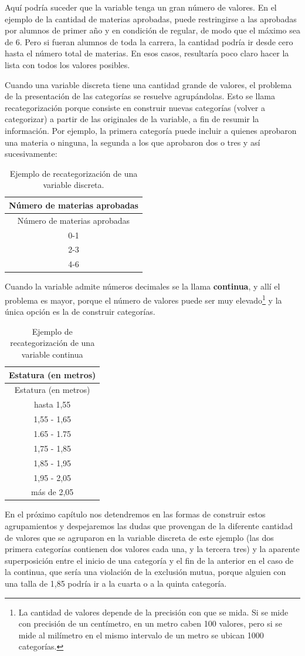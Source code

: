 \documentclass[]{book}
\let\rmarkdownfootnote\footnote%
\def\footnote{\protect\rmarkdownfootnote}
\begin{document}
Aquí podría suceder que la variable tenga un gran número de valores. En el ejemplo de la cantidad de materias aprobadas, puede restringirse a las aprobadas por alumnos de primer año y en condición de regular, de modo que el máximo sea de 6. Pero si fueran alumnos de toda la carrera, la cantidad podría ir desde cero hasta el número total de materias. En esos casos, resultaría poco claro hacer la lista con todos los valores posibles.

Cuando una variable discreta tiene una cantidad grande de valores, el problema de la presentación de las categorías se resuelve agrupándolas. Esto se llama recategorización porque consiste en construir nuevas categorías (volver a categorizar) a partir de las originales de la variable, a fin de resumir la información. Por ejemplo, la primera categoría puede incluir a quienes aprobaron una materia o ninguna, la segunda a los que aprobaron dos o tres y así sucesivamente:

\begin{longtable}[]{@{}c@{}}
\caption{\label{tab:unnamed-chunk-13}Ejemplo de recategorización de una variable discreta.}\tabularnewline
\toprule
Número de materias aprobadas\tabularnewline
\midrule
\endfirsthead
\toprule
Número de materias aprobadas\tabularnewline
\midrule
\endhead
0-1\tabularnewline
2-3\tabularnewline
4-6\tabularnewline
\bottomrule
\end{longtable}

Cuando la variable admite números decimales se la llama \textbf{continua}, y allí el problema es mayor, porque el número de valores puede ser muy elevado\footnote{La cantidad de valores depende de la precisión con que se mida. Si se mide con precisión de un centímetro, en un metro caben 100 valores, pero si se mide al milímetro en el mismo intervalo de un metro se ubican 1000 categorías.} y la única opción es la de construir categorías.

\begin{longtable}[]{@{}c@{}}
\caption{\label{tab:unnamed-chunk-14}Ejemplo de recategorización de una variable continua}\tabularnewline
\toprule
Estatura (en metros)\tabularnewline
\midrule
\endfirsthead
\toprule
Estatura (en metros)\tabularnewline
\midrule
\endhead
hasta 1,55\tabularnewline
1,55 - 1,65\tabularnewline
1.65 - 1.75\tabularnewline
1,75 - 1,85\tabularnewline
1,85 - 1,95\tabularnewline
1,95 - 2,05\tabularnewline
más de 2,05\tabularnewline
\bottomrule
\end{longtable}

En el próximo capítulo nos detendremos en las formas de construir estos agrupamientos y despejaremos las dudas que provengan de la diferente cantidad de valores que se agruparon en la variable discreta de este ejemplo (las dos primera categorías contienen dos valores cada una, y la tercera tres) y la aparente superposición entre el inicio de una categoría y el fin de la anterior en el caso de la continua, que sería una violación de la exclusión mutua, porque alguien con una talla de 1,85 podría ir a la cuarta o a la quinta categoría.
\end{document}
